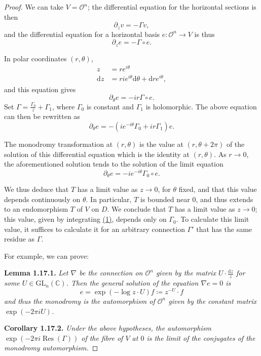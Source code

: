 \documentclass{report}
\newenvironment{itenv}[1]
  {\phantomsection\par\medskip\noindent\textbf{#1.}\itshape}
  {\par\medskip}
\renewcommand{\cal}[1]{{\mathcal{#1}}}
\newcommand{\CC}{\mathbb{C}}
\newcommand{\dd}{\mathrm{d}}
\newcommand{\GL}{\mathrm{GL}}
\DeclareMathOperator{\Res}{Res}
\newcommand{\oldpage}[1]{\marginpar{\footnotesize$\Big\vert$ \textit{p.~#1}}}
\begin{document}
\begin{proof}
  We can take $V=\cal{O}^n$;
  the differential equation for the horizontal sections is then
  \[
    \partial_z v = -\Gamma v,
  \]
  and the differential equation for a horizontal basis $e\colon\cal{O}^n\to V$ is thus
  \[
  \label{II.1.17.proof.1}
    \partial_z e = -\Gamma\circ e.
  \tag{1}
  \]

  In polar coordinates $(r,\theta)$,
  \[
    \begin{aligned}
      z &= re^{i\theta}
    \\\dd z &= rie^{i\theta}\dd\theta+\dd re^{i\theta},
    \end{aligned}
  \]
  and this equation gives
\oldpage{54}
  \[
    \partial_\theta e = -ir\Gamma\circ e.
  \]
  Set $\Gamma=\frac{\Gamma_0}{z}+\Gamma_1$, where $\Gamma_0$ is constant and $\Gamma_1$ is holomorphic.
  The above equation can then be rewritten as
  \[
    \partial_\theta e = -(ie^{-i\theta}\Gamma_0+ir\Gamma_1)e.
  \]

  The monodromy transformation at $(r,\theta)$ is the value at $(r,\theta+2\pi)$ of the solution of this differential equation which is the identity at $(r,\theta)$.
  As $r\to0$, the aforementioned solution tends to the solution of the limit equation
  \[
  \label{II.1.17.proof.2}
    \partial_\theta e = -ie^{-i\theta}\Gamma_0\circ e.
  \tag{2}
  \]

  We thus deduce that $T$ has a limit value as $z\to0$, for $\theta$ fixed, and that this value depends continuously on $\theta$.
  In particular, $T$ is bounded near $0$, and thus extends to an endomorphism $T$ of $V$ on $D$.
  We conclude that $T$ has a limit value as $z\to0$;
  this value, given by integrating \hyperref[II.1.17.proof.1]{(1)}, depends only on $\Gamma_0$.
  To calculate this limit value, it suffices to calculate it for an arbitrary connection $\Gamma'$ that has the same residue as $\Gamma$.

  For example, we can prove:
  \begin{itenv}{Lemma 1.17.1}
  \label{II.1.17.1}
    Let $\nabla$ be the connection on $\cal{O}^n$ given by the matrix $U\cdot\frac{\dd z}{z}$ for some $U\in\GL_n(\CC)$.
    Then the general solution of the equation $\nabla e=0$ is
    \[
      e = \exp(-\log z\cdot U)f \coloneqq z^{-U}\cdot f
    \]
    and thus the monodromy is the automorphism of $\cal{O}^n$ given by the constant matrix $\exp(-2\pi iU)$.
  \end{itenv}

  \begin{itenv}{Corollary 1.17.2}
  \label{II.1.17.2}
    Under the above hypotheses, the automorphism $\exp(-2\pi i\Res(\Gamma))$ of the fibre of $V$ at $0$ is the limit of the conjugates of the monodromy automorphism.
  \end{itenv}


\end{proof}
\end{document}
